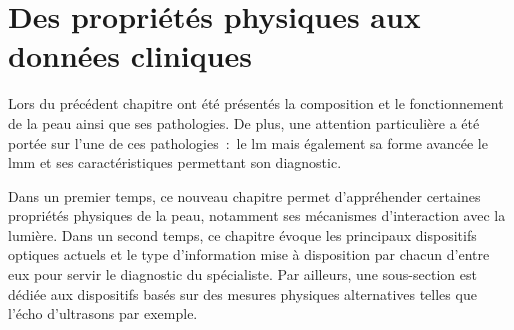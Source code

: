 \renewcommand{\thechapter}{\arabic{chapter}}
\setcounter{chapter}{1}

\chapter{Des propriétés physiques aux données cliniques}
\label{chap:chapter_2}
\chapterintro
Lors du précédent chapitre ont été présentés la composition et le fonctionnement de la peau ainsi que ses pathologies. De plus, une attention particulière a été portée sur l'une de ces pathologies~:~le \acrlong{lm} mais également sa forme avancée le \acrlong{lmm} et ses caractéristiques permettant son diagnostic.\par

Dans un premier temps, ce nouveau chapitre permet d'appréhender certaines propriétés physiques de la peau, notamment ses mécanismes d'interaction avec la lumière. Dans un second temps, ce chapitre évoque les principaux dispositifs optiques actuels et le type d'information mise à disposition par chacun d'entre eux pour servir le diagnostic du spécialiste. Par ailleurs, une sous-section est dédiée aux dispositifs basés sur des mesures physiques alternatives telles que l'écho d'ultrasons par exemple.\par
\newpage

